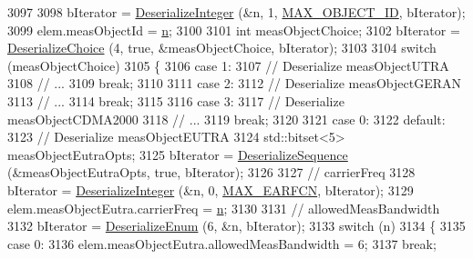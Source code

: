 \begin{DoxyCode}
3097 
3098           bIterator = \hyperlink{classns3_1_1Asn1Header_a49802c9af30018b078150e866b6ecae2}{DeserializeInteger} (&n, 1, \hyperlink{lte-rrc-header_8cc_ab2de695aee029784062779621283535d}{MAX\_OBJECT\_ID}, bIterator);
3099           elem.measObjectId = \hyperlink{namespacesample-rng-plot_aeb5ee5c431e338ef39b7ac5431242e1d}{n};
3100 
3101           \textcolor{keywordtype}{int} measObjectChoice;
3102           bIterator = \hyperlink{classns3_1_1Asn1Header_a0af5881f07a0549a8693a1b75c229a90}{DeserializeChoice} (4, \textcolor{keyword}{true}, &measObjectChoice, bIterator);
3103 
3104           \textcolor{keywordflow}{switch} (measObjectChoice)
3105             \{
3106             \textcolor{keywordflow}{case} 1:
3107               \textcolor{comment}{// Deserialize measObjectUTRA}
3108               \textcolor{comment}{// ...}
3109               \textcolor{keywordflow}{break};
3110 
3111             \textcolor{keywordflow}{case} 2:
3112               \textcolor{comment}{// Deserialize measObjectGERAN}
3113               \textcolor{comment}{// ...}
3114               \textcolor{keywordflow}{break};
3115 
3116             \textcolor{keywordflow}{case} 3:
3117               \textcolor{comment}{// Deserialize measObjectCDMA2000}
3118               \textcolor{comment}{// ...}
3119               \textcolor{keywordflow}{break};
3120 
3121             \textcolor{keywordflow}{case} 0:
3122             \textcolor{keywordflow}{default}:
3123               \textcolor{comment}{// Deserialize measObjectEUTRA}
3124               std::bitset<5> measObjectEutraOpts;
3125               bIterator = \hyperlink{classns3_1_1Asn1Header_a58c68bb97ba3fe2e8fcdd7c208d672b2}{DeserializeSequence} (&measObjectEutraOpts, \textcolor{keyword}{true}, bIterator);
3126 
3127               \textcolor{comment}{// carrierFreq}
3128               bIterator = \hyperlink{classns3_1_1Asn1Header_a49802c9af30018b078150e866b6ecae2}{DeserializeInteger} (&n, 0, 
      \hyperlink{lte-rrc-header_8cc_a7851a91be0aab6446639f0ff8ee48b45}{MAX\_EARFCN}, bIterator);
3129               elem.measObjectEutra.carrierFreq = \hyperlink{namespacesample-rng-plot_aeb5ee5c431e338ef39b7ac5431242e1d}{n};
3130 
3131               \textcolor{comment}{// allowedMeasBandwidth}
3132               bIterator = \hyperlink{classns3_1_1Asn1Header_a4fcc253e0eec3483c775b005c1875f2d}{DeserializeEnum} (6, &n, bIterator);
3133               \textcolor{keywordflow}{switch} (n)
3134                 \{
3135                 \textcolor{keywordflow}{case} 0:
3136                   elem.measObjectEutra.allowedMeasBandwidth = 6;
3137                   \textcolor{keywordflow}{break};

\end{DoxyCode}
